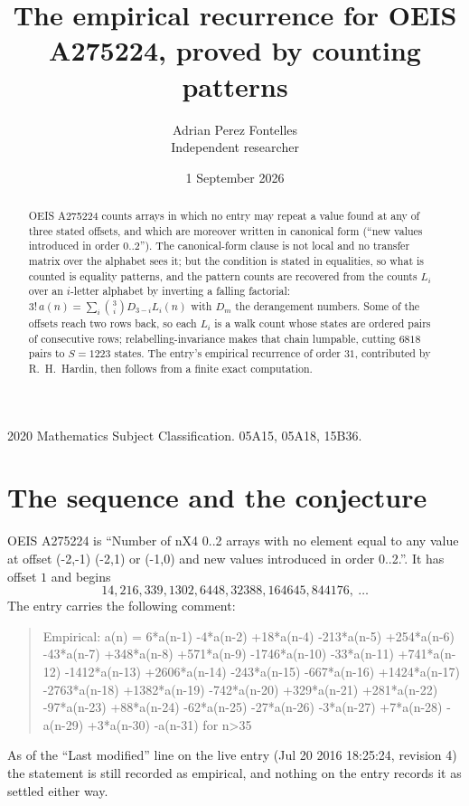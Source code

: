 \documentclass[11pt,a4paper]{article}
\title{The empirical recurrence for OEIS A275224, proved by counting patterns}
\author{Adrian Perez Fontelles\\ \small Independent researcher}
\date{1 September 2026}
\theoremstyle{plain}
\theoremstyle{definition}
\begin{document}
\maketitle

\begin{abstract}
OEIS A275224 counts arrays in which no entry may repeat a value found at any of three stated
offsets, and which are moreover written in canonical form (``new values introduced in order
$0..2$''). The canonical-form clause is not local and no transfer matrix over the
alphabet sees it; but the condition is stated in equalities, so what is counted is equality
patterns, and the pattern counts are recovered from the counts $L_i$ over an $i$-letter
alphabet by inverting a falling factorial:
$3!\,a(n)=\sum_i\binom{3}{i}D_{3-i}L_i(n)$ with $D_m$ the derangement numbers.
Some of the offsets reach two rows back, so each $L_i$ is a walk count whose states are
ordered pairs of consecutive rows; relabelling-invariance makes that chain lumpable,
cutting $6818$ pairs to $S=1223$ states. The entry's empirical recurrence of order $31$,
contributed by R.~H.~Hardin, then follows from a finite exact computation.
\end{abstract}

\noindent\small 2020 Mathematics Subject Classification. 05A15, 05A18, 15B36.\normalsize

\section{The sequence and the conjecture}

OEIS A275224 is ``Number of nX4 0..2 arrays with no element equal to any value at offset (-2,-1) (-2,1) or (-1,0) and new values introduced in order 0..2.''. It has offset $1$ and begins
\[
14, 216, 339, 1302, 6448, 32388, 164645, 844176,\ \dots
\]
The entry carries the following comment:
\begin{quote}\small
Empirical: a(n) = 6*a(n-1) -4*a(n-2) +18*a(n-4) -213*a(n-5) +254*a(n-6) -43*a(n-7) +348*a(n-8) +571*a(n-9) -1746*a(n-10) -33*a(n-11) +741*a(n-12) -1412*a(n-13) +2606*a(n-14) -243*a(n-15) -667*a(n-16) +1424*a(n-17) -2763*a(n-18) +1382*a(n-19) -742*a(n-20) +329*a(n-21) +281*a(n-22) -97*a(n-23) +88*a(n-24) -62*a(n-25) -27*a(n-26) -3*a(n-27) +7*a(n-28) -a(n-29) +3*a(n-30) -a(n-31) for n>35
\end{quote}
As of the ``Last modified'' line on the live entry (Jul 20 2016 18:25:24, revision 4) the statement is
still recorded as empirical, and nothing on the entry records it as settled either way.
\end{document}
